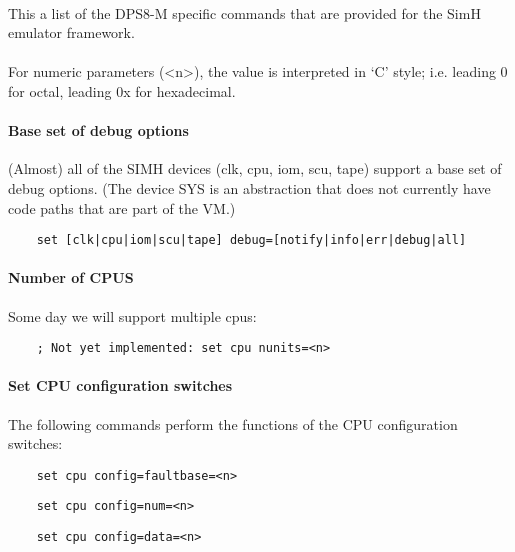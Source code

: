 \documentclass[notitlepage]{report}
\begin{document}
\paragraph{}
This a list of the DPS8-M specific commands that are provided for the SimH emulator framework.

\paragraph{}
For numeric parameters (<n>), the value is interpreted in `C' style; i.e. leading 0 for octal, leading 0x for hexadecimal.

\paragraph{Base set of debug options} (Almost) all of the SIMH devices (clk, cpu, iom, scu, tape) support a base set of debug options. (The device SYS is an abstraction that does not currently have code paths that are part of the VM.)

\begin{lstlisting}
	set [clk|cpu|iom|scu|tape] debug=[notify|info|err|debug|all]
\end{lstlisting}

\paragraph{Number of CPUS} Some day we will support multiple cpus:

\begin{lstlisting}
	; Not yet implemented: set cpu nunits=<n>
\end{lstlisting}


\paragraph{Set CPU configuration switches}
The following commands perform the functions of the CPU configuration switches:

\begin{lstlisting}
	set cpu config=faultbase=<n>
\end{lstlisting}

\begin{lstlisting}
	set cpu config=num=<n>
\end{lstlisting}

\begin{lstlisting}
	set cpu config=data=<n>
\end{lstlisting}
\end{document}
